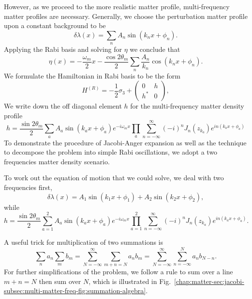 However, as we proceed to the more realistic matter profile, multi-frequency matter profiles are necessary. Generally, we choose the perturbation matter profile upon a constant background to be
\begin{equation}
   \delta \lambda(x) = \sum_n A_n \sin (k_n x + \phi_n). 
\end{equation}
Applying the Rabi basis and solving for $\eta$ we conclude that
\begin{equation}
   \eta(x) = - \frac{\omega_m}{2}x - \frac{\cos 2\theta_m}{2} \sum_n \frac{A_n}{k_n} \cos ( k_n x+ \phi_n ). 
\end{equation}
We formulate the Hamiltonian in Rabi basis to be the form
\begin{equation}
    H^{(R)} = -\frac{1}{2}\sigma_3 + \begin{pmatrix}
    0 & h\\
    h^{*} & 0
    \end{pmatrix},
\end{equation}
We write down the off diagonal element $h$ for the multi-frequency matter density profile
\begin{equation}
   h = \frac{\sin 2\theta_m}{2} \sum_a A_a \sin (k_a x + \phi_a) e^{-i\omega_m x}\prod_{a} \sum_{n=-\infty}^{\infty} (-i)^n J_n (z_{k_a}) e^{i n(k_a x + \phi_a) } 
\end{equation}
To demonstrate the procedure of Jacobi-Anger expansion as well as the technique to decompose the problem into simple Rabi oscillations, we adopt a two frequencies matter density scenario.


To work out the equation of motion that we could solve, we deal with two frequencies first,
\begin{equation}
   \delta \lambda ( x ) = A_1\sin (k_1 x + \phi_1) + A_2 \sin (k_2 x + \phi_2), 
\end{equation}
while
\begin{equation}
   h = \frac{\sin 2\theta_m}{2} \sum_{a = 1}^2 A_a \sin (k_a x + \phi_a) e^{-i\omega_m x}\prod_{a=1}^2 \sum_{n=-\infty}^{\infty} (-i)^n J_n (z_{k_a}) e^{i n(k_a x + \phi_a) }. 
   \label{chap:matter-sec:jacobi-subsec:multi-matter-freq-eqn:rabi-hamil-off}
\end{equation}

A useful trick for multiplication of two summations is
\begin{equation}
  \sum_n a_n \sum_m b_m  = \sum_{N = -\infty}^{\infty} \sum_{m+n=N} a_n b_m = \sum_{N=-\infty}^\infty \sum_{n=-\infty}^{N} a_n b_{N-n}.
  \label{chap:matter-sec:jacobi-subsec:multi-matter-freq-eqn:multiplication-summation-rule}
\end{equation}
For further simplifications of the problem, we follow a rule to sum over a line $m+n=N$ then sum over $N$, which is illustrated in Fig.~\ref{chap:matter-sec:jacobi-subsec:multi-matter-freq-fig:summation-algebra}.

